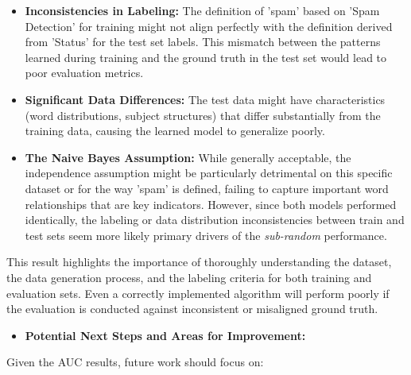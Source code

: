 \documentclass[12pt,a4paper]{article}
\begin{document}
\begin{itemize}
    \item \textbf{Inconsistencies in Labeling:} The definition of 'spam' based on 'Spam Detection' for training might not align perfectly with the definition derived from 'Status' for the test set labels. This mismatch between the patterns learned during training and the ground truth in the test set would lead to poor evaluation metrics.
    \item \textbf{Significant Data Differences:} The test data might have characteristics (word distributions, subject structures) that differ substantially from the training data, causing the learned model to generalize poorly.
    \item \textbf{The Naive Bayes Assumption:} While generally acceptable, the independence assumption might be particularly detrimental on this specific dataset or for the way 'spam' is defined, failing to capture important word relationships that are key indicators. However, since both models performed identically, the labeling or data distribution inconsistencies between train and test sets seem more likely primary drivers of the \textit{sub-random} performance.
\end{itemize}

This result highlights the importance of thoroughly understanding the dataset, the data generation process, and the labeling criteria for both training and evaluation sets. Even a correctly implemented algorithm will perform poorly if the evaluation is conducted against inconsistent or misaligned ground truth.

\begin{itemize}
    \item \textbf{Potential Next Steps and Areas for Improvement:}
\end{itemize}

Given the AUC results, future work should focus on:
\end{document}
